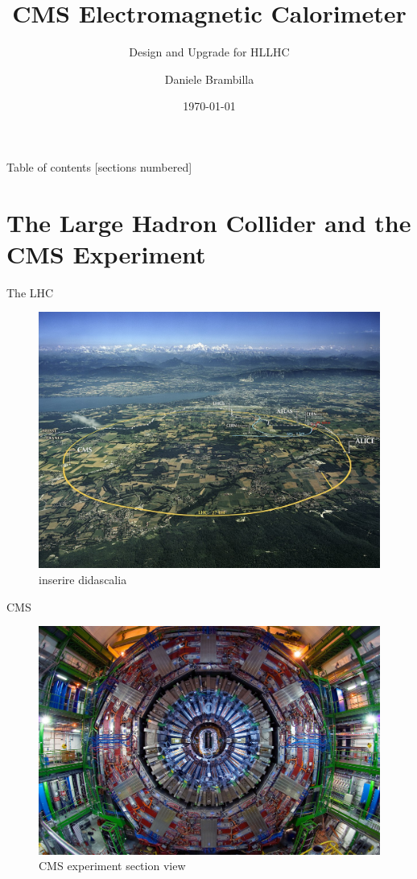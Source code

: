 \documentclass[10pt]{beamer}
\title{CMS Electromagnetic Calorimeter}
\subtitle{Design and Upgrade for HLLHC}
\date{\today}
\author{Daniele Brambilla}
\institute{University of Milano Bicocca}
\begin{document}
\maketitle

\begin{frame}{Table of contents}
  [sections numbered]
  \tableofcontents%
\end{frame}

\section[Introduction]{The Large Hadron Collider and the CMS Experiment}

\begin{frame}[fragile]{The LHC}
    \begin{figure}
        \centering
        \includegraphics[width=.85\textwidth]{./img/CERN_LHC.jpg}
        \caption{inserire didascalia}
        \label{fig:cern_lhc}
    \end{figure}
\end{frame}

\begin{frame}[fragile]{CMS}
  \begin{figure}
        \centering
        \includegraphics[width=\textwidth]{./img/CMS_front.jpg}
        \caption{CMS experiment section view}
        \label{fig:cms_front}
    \end{figure}
\end{frame}
\end{document}

